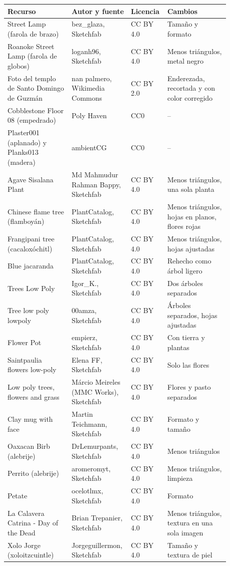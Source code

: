 \documentclass[11pt,a4paper]{article}
\begin{document}
\begin{longtable}{|p{0.28\linewidth}|p{0.2\linewidth}|p{0.13\linewidth}|p{0.27\linewidth}|}
  \hline
  \textbf{Recurso} & \textbf{Autor y fuente} & \textbf{Licencia} & \textbf{Cambios} \\ \hline
  \endhead
  Street Lamp (farola de brazo) & bez\_glaza, Sketchfab & CC BY 4.0 & Tamaño y formato \\ \hline
  Roanoke Street Lamp (farola de globos) & loganh96, Sketchfab & CC BY 4.0 & Menos triángulos, metal negro \\ \hline
  Foto del templo de Santo Domingo de Guzmán & nan palmero, Wikimedia Commons & CC BY 2.0 & Enderezada, recortada y con color corregido \\ \hline
  Cobblestone Floor 08 (empedrado) & Poly Haven & CC0 & -- \\ \hline
  Plaster001 (aplanado) y Planks013 (madera) & ambientCG & CC0 & -- \\ \hline
  Agave Sisalana Plant & Md Mahmudur Rahman Bappy, Sketchfab & CC BY 4.0 & Menos triángulos, una sola planta \\ \hline
  Chinese flame tree (flamboyán) & PlantCatalog, Sketchfab & CC BY 4.0 & Menos triángulos, hojas en planos, flores rojas \\ \hline
  Frangipani tree (cacaloxóchitl) & PlantCatalog, Sketchfab & CC BY 4.0 & Menos triángulos, hojas ajustadas \\ \hline
  Blue jacaranda & PlantCatalog, Sketchfab & CC BY 4.0 & Rehecho como árbol ligero \\ \hline
  Trees Low Poly & Igor\_K., Sketchfab & CC BY 4.0 & Dos árboles separados \\ \hline
  Tree low poly lowpoly & 00amza, Sketchfab & CC BY 4.0 & Árboles separados, hojas ajustadas \\ \hline
  Flower Pot & empierz, Sketchfab & CC BY 4.0 & Con tierra y plantas \\ \hline
  Saintpaulia flowers low-poly & Elena FF, Sketchfab & CC BY 4.0 & Solo las flores \\ \hline
  Low poly trees, flowers and grass & Márcio Meireles (MMC Works), Sketchfab & CC BY 4.0 & Flores y pasto separados \\ \hline
  Clay mug with face & Martin Teichmann, Sketchfab & CC BY 4.0 & Formato y tamaño \\ \hline
  Oaxacan Birb (alebrije) & DrLemurpants, Sketchfab & CC BY 4.0 & Menos triángulos \\ \hline
  Perrito (alebrije) & aromeromyt, Sketchfab & CC BY 4.0 & Menos triángulos, limpieza \\ \hline
  Petate & ocelotlmx, Sketchfab & CC BY 4.0 & Formato \\ \hline
  La Calavera Catrina - Day of the Dead & Brian Trepanier, Sketchfab & CC BY 4.0 & Menos triángulos, textura en una sola imagen \\ \hline
  Xolo Jorge (xoloitzcuintle) & Jorgeguillermon, Sketchfab & CC BY 4.0 & Tamaño y textura de piel \\ \hline
\end{longtable}
\end{document}
